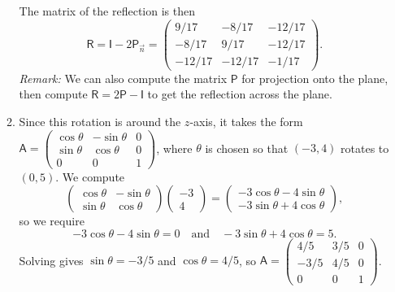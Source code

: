 \begin{enumerate}
\begin{enumerate}
\begin{equation*}
\end{equation*}
The matrix of the reflection is then
\begin{equation*}
\mathsf{R} = \mathsf{I} - 2\mathsf{P}_{\vec{n}} = \begin{pmatrix} 9/17 & -8/17 & -12/17 \\ -8/17 & 9/17 & -12/17 \\ -12/17 & -12/17 & -1/17 \end{pmatrix}.
\end{equation*}
\emph{Remark:} We can also compute the matrix $\mathsf{P}$ for projection onto the plane, then compute $\mathsf{R} = 2\mathsf{P} - \mathsf{I}$ to get the reflection across the plane.
\newpage
\item Since this rotation is around the $z$-axis, it takes the form $\mathsf{A} = \begin{pmatrix} \cos\theta & -\sin\theta & 0 \\ \sin\theta & \cos\theta & 0 \\ 0 & 0 & 1 \end{pmatrix}$, where $\theta$ is chosen so that $(-3,4)$ rotates to $(0,5)$. We compute
\begin{equation*}
\begin{pmatrix} \cos\theta & -\sin\theta \\ \sin\theta & \cos\theta \end{pmatrix}\begin{pmatrix} -3 \\ 4 \end{pmatrix} = \begin{pmatrix} -3\cos\theta - 4\sin\theta \\ -3\sin\theta + 4\cos\theta \end{pmatrix},
\end{equation*}
so we require
\begin{equation*}
-3\cos\theta - 4\sin\theta = 0\quad\text{and}\quad -3\sin\theta + 4\cos\theta = 5.
\end{equation*}
Solving gives $\sin\theta = -3/5$ and $\cos\theta = 4/5$, so $\mathsf{A} = \begin{pmatrix} 4/5 & 3/5 & 0 \\ -3/5 & 4/5 & 0 \\ 0 & 0 & 1 \end{pmatrix}$.

\end{enumerate}
\end{enumerate}
